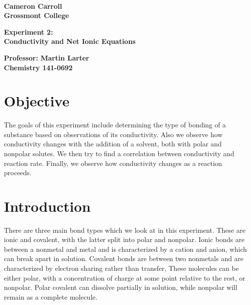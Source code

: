 \documentclass[fleqn,titlepage]{article}
\begin{document}
\begin{titlepage}
  \mbox{}\\[1.25cm]
  \textbf{\LARGE Cameron Carroll \\ Grossmont College}\\[2.25cm]
  \begin{center}
    \textbf{\huge Experiment 2: \\ Conductivity and Net Ionic Equations}\\[2.50cm]
  \end{center}
  \textbf{\LARGE Professor: Martin Larter \\ Chemistry 141-0692} \\
  \vfill
\end{titlepage}

\section*{Objective}
  \paragraph{} The goals of this experiment include determining the type of bonding of a substance based on observations of its conductivity. Also we observe how conductivity changes with the addition of a solvent, both with polar and nonpolar solutes. We then try to find a correlation between conductivity and reaction rate. Finally, we observe how conductivity changes as a reaction proceeds.


\section*{Introduction}
  \paragraph{} There are three main bond types which we look at in this experiment. These are ionic and covalent, with the latter split into polar and nonpolar. Ionic bonds are between a nonmetal and metal and is characterized by a cation and anion, which can break apart in solution. Covalent bonds are between two nonmetals and are characterized by electron sharing rather than transfer, These molecules can be either polar, with a concentration of charge at some point relative to the rest, or nonpolar. Polar covalent can dissolve partially in solution, while nonpolar will remain as a complete molecule.
\end{document}
